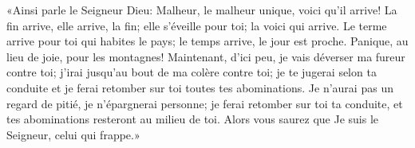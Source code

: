 «Ainsi parle le Seigneur Dieu: Malheur, le malheur unique, voici qu’il arrive!
	La fin arrive, elle arrive, la fin;
	elle s’éveille pour toi; la voici qui arrive.
Le terme arrive pour toi qui habites le pays;
	le temps arrive, le jour est proche.
	Panique, au lieu de joie, pour les montagnes!
Maintenant, d’ici peu, je vais déverser ma fureur contre toi;
	j’irai jusqu’au bout de ma colère contre toi;
	je te jugerai selon ta conduite et je ferai retomber sur toi toutes tes abominations.
Je n’aurai pas un regard de pitié, je n’épargnerai personne;
	je ferai retomber sur toi ta conduite,
	et tes abominations resteront au milieu de toi.
Alors vous saurez que Je suis le Seigneur, celui qui frappe.»
